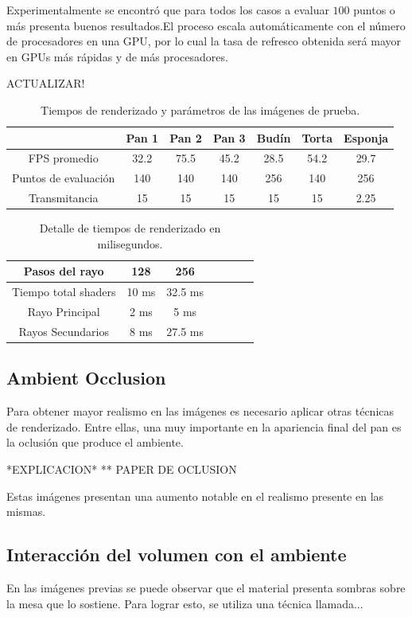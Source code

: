 \documentclass[spanish,a4paper,openright,11pt]{book}
\begin{document}
Experimentalmente se encontró que para todos los casos a evaluar $100$ puntos o más presenta buenos resultados.El proceso escala automáticamente con el número de procesadores en una GPU, por lo cual la tasa de refresco obtenida será mayor en GPUs más rápidas y de más procesadores.


ACTUALIZAR!
\begin{table}[htb]
\centering
\begin{tabular}{|c|c|c|c|c|c|c|}
\hline &  Pan 1 & Pan 2 & Pan 3 & Budín & Torta & Esponja \\
\hline
\hline
 FPS promedio  & 32.2 &  75.5 &  45.2 & 28.5 &  54.2 & 29.7\\
\hline
 Puntos de evaluación &  140 &  140 &  140 & 256 &  140 & 256 \\
\hline
 Transmitancia &  15 &  15 &  15 & 15 &  15 & 2.25 \\
\hline
\end{tabular}
\caption{Tiempos de renderizado y parámetros de las imágenes de prueba.}
\label{tab:n1}
\end{table}

\begin{table}[htb]
\centering
\begin{tabular}{|c|c|c|c|c|c|c|}
\hline
 Pasos del rayo         & 128 &  256 \\
\hline
\hline
 Tiempo total shaders   & 10 ms &  32.5 ms \\
\hline
 Rayo Principal         & 2 ms  & 5 ms  \\
\hline
 Rayos Secundarios      &  8 ms & 27.5 ms  \\
\hline
\end{tabular}
\caption{Detalle de tiempos de renderizado en milisegundos.}
\label{tab:n2}
\end{table}


\subsection{Ambient Occlusion}
Para obtener mayor realismo en las imágenes es necesario aplicar otras técnicas de renderizado. Entre ellas, una muy importante en la apariencia final del pan es la oclusión que produce el ambiente.

*EXPLICACION* 
** PAPER DE OCLUSION

Estas imágenes presentan una aumento notable en el realismo presente en las mismas.

\subsection{Interacción del volumen con el ambiente}
En las imágenes previas se puede observar que el material presenta sombras sobre la mesa que lo sostiene. Para lograr esto, se utiliza una técnica llamada...
\end{document}
